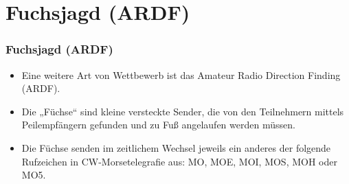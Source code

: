
\section{Fuchsjagd (ARDF)}
\label{section:ardf}
\begin{frame}%
    \frametitle{Fuchsjagd (ARDF)}
    \begin{itemize}
        \item Eine weitere Art von Wettbewerb ist das Amateur Radio Direction Finding (ARDF).
        \item Die „Füchse“ sind kleine versteckte Sender, die von den Teilnehmern mittels Peilempfängern gefunden und zu Fuß angelaufen werden müssen.
        \item Die Füchse senden im zeitlichem Wechsel jeweils ein anderes der folgende Rufzeichen in CW-Morsetelegrafie aus: MO, MOE, MOI, MOS, MOH oder MO5.
    \end{itemize}
\end{frame}


